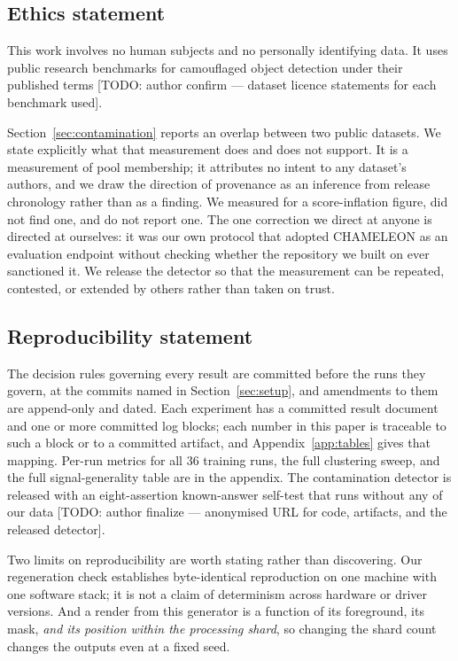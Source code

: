 \documentclass{article} %
\begin{document}
\subsection*{Ethics statement}

This work involves no human subjects and no personally identifying data. It uses public research
benchmarks for camouflaged object detection under their published terms
[TODO: author confirm --- dataset licence statements for each benchmark used].

Section~\ref{sec:contamination} reports an overlap between two public datasets. We state explicitly
what that measurement does and does not support. It is a measurement of pool membership; it attributes
no intent to any dataset's authors, and we draw the direction of provenance as an inference from
release chronology rather than as a finding. We measured for a score-inflation figure, did not find
one, and do not report one. The one correction we direct at anyone is directed at ourselves: it was
our own protocol that adopted CHAMELEON as an evaluation endpoint without checking whether the
repository we built on ever sanctioned it. We release the detector so that the measurement can be
repeated, contested, or extended by others rather than taken on trust.

\subsection*{Reproducibility statement}

The decision rules governing every result are committed before the runs they govern, at the commits
named in Section~\ref{sec:setup}, and amendments to them are append-only and dated. Each experiment
has a committed result document and one or more committed log blocks; each number in this paper is
traceable to such a block or to a committed artifact, and Appendix~\ref{app:tables} gives that
mapping. Per-run metrics for all $36$ training runs, the full clustering sweep, and the full
signal-generality table are in the appendix. The contamination detector is released with an
eight-assertion known-answer self-test that runs without any of our data
[TODO: author finalize --- anonymised URL for code, artifacts, and the released detector].

Two limits on reproducibility are worth stating rather than discovering. Our regeneration check
establishes byte-identical reproduction on one machine with one software stack; it is not a claim of
determinism across hardware or driver versions. And a render from this generator is a function of its
foreground, its mask, \emph{and its position within the processing shard}, so changing the shard count
changes the outputs even at a fixed seed.
\end{document}

